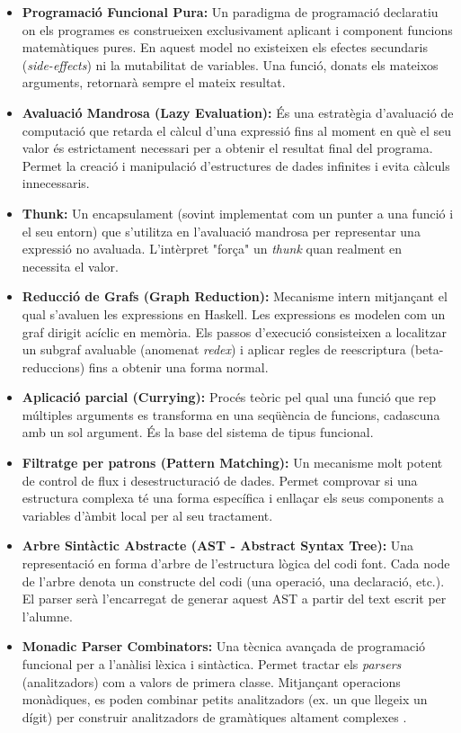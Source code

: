 \begin{itemize}
    \item \textbf{Programació Funcional Pura:} Un paradigma de programació declaratiu on els programes es construeixen exclusivament aplicant i component funcions matemàtiques pures. En aquest model no existeixen els efectes secundaris (\textit{side-effects}) ni la mutabilitat de variables. Una funció, donats els mateixos arguments, retornarà sempre el mateix resultat.
    
    \item \textbf{Avaluació Mandrosa (Lazy Evaluation):} És una estratègia d'avaluació de computació que retarda el càlcul d'una expressió fins al moment en què el seu valor és estrictament necessari per a obtenir el resultat final del programa. Permet la creació i manipulació d'estructures de dades infinites i evita càlculs innecessaris.
    
    \item \textbf{Thunk:} Un encapsulament (sovint implementat com un punter a una funció i el seu entorn) que s'utilitza en l'avaluació mandrosa per representar una expressió no avaluada. L'intèrpret "força" un \textit{thunk} quan realment en necessita el valor.
    
    \item \textbf{Reducció de Grafs (Graph Reduction):} Mecanisme intern mitjançant el qual s'avaluen les expressions en Haskell. Les expressions es modelen com un graf dirigit acíclic en memòria. Els passos d'execució consisteixen a localitzar un subgraf avaluable (anomenat \textit{redex}) i aplicar regles de reescriptura (beta-reduccions) fins a obtenir una forma normal.
    
    \item \textbf{Aplicació parcial (Currying):} Procés teòric pel qual una funció que rep múltiples arguments es transforma en una seqüència de funcions, cadascuna amb un sol argument. És la base del sistema de tipus funcional.
    
    \item \textbf{Filtratge per patrons (Pattern Matching):} Un mecanisme molt potent de control de flux i desestructuració de dades. Permet comprovar si una estructura complexa té una forma específica i enllaçar els seus components a variables d'àmbit local per al seu tractament.
    
    \item \textbf{Arbre Sintàctic Abstracte (AST - Abstract Syntax Tree):} Una representació en forma d'arbre de l'estructura lògica del codi font. Cada node de l'arbre denota un constructe del codi (una operació, una declaració, etc.). El parser serà l'encarregat de generar aquest AST a partir del text escrit per l'alumne.
    
    \item \textbf{Monadic Parser Combinators:} Una tècnica avançada de programació funcional per a l'anàlisi lèxica i sintàctica. Permet tractar els \textit{parsers} (analitzadors) com a valors de primera classe. Mitjançant operacions monàdiques, es poden combinar petits analitzadors (ex. un que llegeix un dígit) per construir analitzadors de gramàtiques altament complexes \cite{hutton1996monadic}.
\end{itemize}

